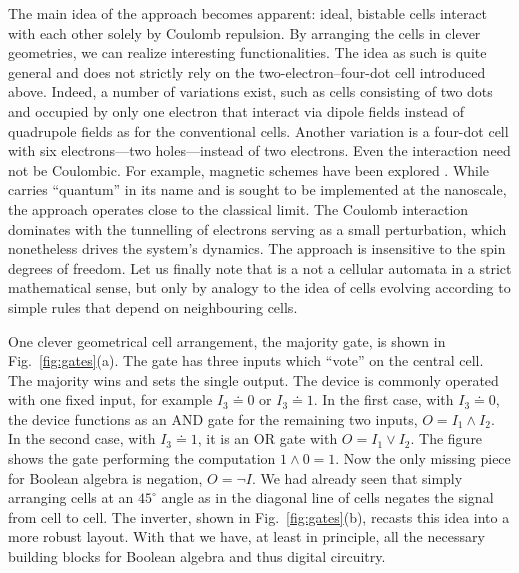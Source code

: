 The main idea of the  approach becomes apparent: ideal, bistable cells
interact with each other solely by Coulomb repulsion. By arranging the cells in
clever geometries, we can realize interesting functionalities. The idea as such
is quite general and does not strictly rely on the two-electron--four-dot cell
introduced above. Indeed, a number of variations exist, such as cells consisting
of two dots and occupied by only one electron that interact via dipole fields
instead of quadrupole fields as for the conventional cells. Another variation is
a four-dot cell with six electrons---two holes---instead of two electrons. Even
the interaction need not be Coulombic. For example, magnetic  schemes
have been explored \cite{bernstein2005magnetic}. While  carries
``quantum'' in its name and is sought to be implemented at the nanoscale, the
approach operates close to the classical limit. The Coulomb interaction
dominates with the tunnelling of electrons serving as a small perturbation,
which nonetheless drives the system's dynamics. The approach is insensitive to
the spin degrees of freedom. Let us finally note that  is a not a
cellular automata in a strict mathematical sense, but only by analogy to the
idea of cells evolving according to simple rules that depend on neighbouring
cells.

One clever geometrical cell arrangement, the majority gate, is shown in
Fig.~\ref{fig:gates}(a). The gate has three inputs which ``vote'' on the central
cell. The majority wins and sets the single output. The device is commonly
operated with one fixed input, for example $I_3 \doteq 0$ or $I_3 \doteq 1$. In
the first case, with $I_3 \doteq 0$, the device functions as an AND gate for the
remaining two inputs, $O = I_1 \land I_2$. In the second case, with $I_3 \doteq
1$, it is an OR gate with $O = I_1 \lor I_2$. The figure shows the gate
performing the computation $1 \land 0 = 1$. Now the only missing piece for
Boolean algebra is negation, $O = \lnot I$. We had already seen that simply
arranging cells at an $45^{\circ}$ angle as in the diagonal line of cells
negates the signal from cell to cell. The inverter, shown in
Fig.~\ref{fig:gates}(b), recasts this idea into a more robust layout. With that
we have, at least in principle, all the necessary building blocks for Boolean
algebra and thus digital circuitry.

